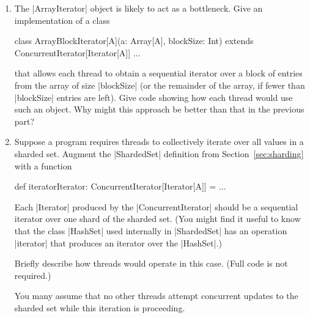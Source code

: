 \begin{question}
\begin{enumerate}

\item
The  |ArrayIterator| object is likely to act as a bottleneck.  Give an
implementation of a class
%
\begin{scala}
class ArrayBlockIterator[A](a: Array[A], blockSize: Int)
    extends ConcurrentIterator[Iterator[A]]{ ... }
\end{scala}
%
that allows each thread to obtain a sequential iterator over a block of entries
from the array of size |blockSize| (or the remainder of the array, if
fewer than |blockSize| entries are left).  Give code showing how each thread
would use such an object.  Why might this approach be better than that in the
previous part? 


\item
Suppose a program requires threads to collectively iterate over all values in
a sharded set.  Augment the |ShardedSet|  definition from
Section~\ref{sec:sharding} with a function
%
\begin{scala}
  def iteratorIterator: ConcurrentIterator[Iterator[A]] = ...
\end{scala}
%
Each |Iterator| produced by the |ConcurrentIterator| should be a sequential
iterator over one shard of the sharded set.  (You might find it useful to know
that the class |HashSet| used internally in |ShardedSet| has an operation
|iterator| that produces an iterator over the |HashSet|.)

Briefly describe how threads would operate in this case.  (Full code is not
required.)  

You many assume that no other threads  attempt concurrent updates to the
sharded set while this iteration is proceeding.
\end{enumerate}
\end{question}


